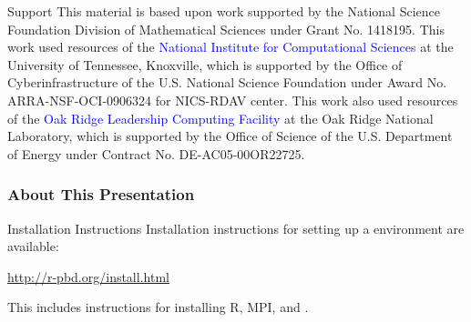 \begin{frame}[noframenumbering]
\begin{block}{Support}\tiny
  This material is based upon work supported by the National Science
  Foundation Division of Mathematical Sciences under Grant No. 1418195.
  This work used resources of the \textcolor{blue}{National Institute for
  Computational Sciences} at the University of Tennessee, Knoxville,
  which is supported by the Office of Cyberinfrastructure of the
  U.S. National Science Foundation under Award  No. ARRA-NSF-OCI-0906324
  for NICS-RDAV center.
  This work also used resources of the \textcolor{blue}{Oak Ridge
  Leadership Computing Facility} at the Oak Ridge National
  Laboratory, which is supported by the Office of Science of the
  U.S. Department of Energy under Contract No. DE-AC05-00OR22725.\\[.2cm]
\end{block}
\end{frame}




\begin{frame}
\frametitle{About This Presentation}
 \begin{block}{Installation Instructions}
  Installation instructions for setting up a \pbdR environment are available:
  \begin{center}
  \url{http://r-pbd.org/install.html}
  \end{center}
  This includes instructions for installing R, MPI, and \pbdR.
 \end{block}
\end{frame}


